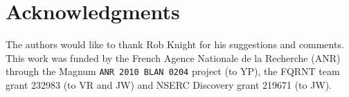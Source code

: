 \section{Acknowledgments}
\label{sec:acknowledgments}
The authors would like to thank Rob Knight for his suggestions and comments.
This work was funded by the French Agence Nationale de la Recherche (ANR) through the {\sc Magnum} {\tt ANR 2010 BLAN 0204} 
project (to YP), the
FQRNT team grant 232983 (to VR and JW) and NSERC Discovery grant 219671 (to JW).
